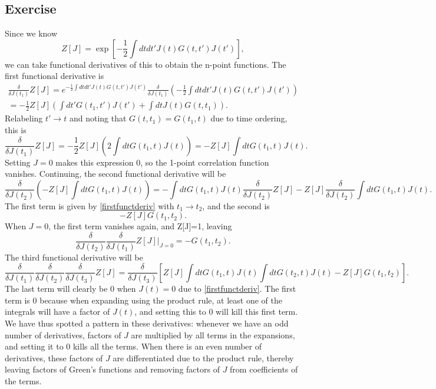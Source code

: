 \subsection{Exercise}
Since we know 
\begin{equation}
    Z[J]=\exp[-\frac 1 2 \int dt dt' J(t)G(t,t')J(t')],
\end{equation}
we can take functional derivatives of this to obtain the n-point functions. The first functional derivative is 
\begin{align}
    \frac \delta {\delta J(t_1)} Z[J]=e^{-\frac 1 2 \int dt dt' J(t)G(t,t')J(t')}\frac \delta {\delta J(t_1)}\left(-\frac 1 2 \int dt dt' J(t)G(t,t')J(t')\right)\\=-\frac 1 2 Z[J]\left( \int dt' G(t_1,t')J(t')+\int dt J(t)G(t,t_1)\right).
\end{align}
Relabeling $t'\to t$ and noting that $G(t,t_1)=G(t_1,t)$ due to time ordering, this is
\begin{equation}
    \label{firstfunctderiv}
    \frac \delta {\delta J(t_1)}Z[J]=-\frac 1 2 Z[J] \left (2\int dt G(t_1,t)J(t) \right)=-Z[J]\int dt G(t_1,t)J(t).
\end{equation}
Setting $J=0$ makes this expression 0, so the 1-point correlation function vanishes. Continuing, the second functional derivative will be 
\begin{equation}
    \frac \delta {\delta J(t_2)} \left (-Z[J]\int dt G(t_1,t)J(t)\right )= - \int dt G(t_1,t)J(t)\frac \delta {\delta J(t_2)} Z[J]-Z[J]\frac \delta {\delta J(t_2)} \int dt G(t_1,t)J(t).
\end{equation}
The first term is given by \eqref{firstfunctderiv} with $t_1\to t_2$, and the second is 
\begin{equation}
    -Z[J]G(t_1,t_2).
\end{equation}
When $J=0$, the first term vanishes again, and Z[J]=1, leaving
\begin{equation}
    \frac \delta {\delta J(t_2)}\frac \delta {\delta J(t_1)} Z[J]|_{J=0}=-G(t_1,t_2).
\end{equation}
The third functional derivative will be
\begin{equation}
    \label{thirdfunct}
    \frac \delta {\delta J(t_1)}\frac \delta {\delta J(t_2)}\frac \delta {\delta J(t_3)} Z[J]=\frac \delta {\delta J(t_3)}\left [  Z[J]\int dt G(t_1,t)J(t)\int dt G(t_2,t)J(t) -Z[J]G(t_1,t_2)\right].
\end{equation}
The last term will clearly be 0 when $J(t)=0$ due to \eqref{firstfunctderiv}. The first term is 0 because when expanding using the product rule, at least one of the integrals will have a factor of $J(t)$, and setting this to $0$ will kill this first term. We have thus spotted a pattern in these derivatives: whenever we have an odd number of derivatives, factors of $J$ are multiplied by all terms in the expansions, and setting it to $0$ kills all the terms. When there is an even number of derivatives, these factors of $J$ are differentiated due to the product rule, thereby leaving factors of Green's functions and removing factors of $J$ from coefficients of the terms. 

